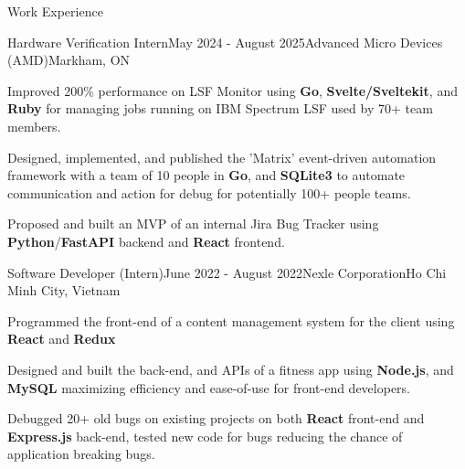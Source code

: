 \documentclass[
	11pt, %
]{resume} %
\begin{document}


\begin{rSection}{Work Experience}

	\begin{rSubsection}{Hardware Verification Intern}{May 2024 - August 2025}{Advanced Micro Devices (AMD)}{Markham, ON}
	\item Improved 200\% performance on LSF Monitor using \textbf{Go}, \textbf{Svelte/Sveltekit}, and \textbf{Ruby} for managing jobs running on IBM Spectrum LSF used by 70+ team members.
	\item Designed, implemented, and published the 'Matrix' event-driven automation framework with a team of 10 people in \textbf{Go}, and \textbf{SQLite3} to automate communication and action for debug for potentially 100+ people teams.
	\item Proposed and built an MVP of an internal Jira Bug Tracker using \textbf{Python}/\textbf{FastAPI} backend and \textbf{React} frontend.
	\end{rSubsection}

	\begin{rSubsection}{Software Developer (Intern)}{June 2022 - August 2022}{Nexle Corporation}{Ho Chi Minh City, Vietnam}
		\item Programmed the front-end of a content management system for the client using \textbf{React} and \textbf{Redux}
		\item Designed and built the back-end, and APIs of a fitness app using \textbf{Node.js}, and \textbf{MySQL} maximizing efficiency and ease-of-use for front-end developers.
		\item Debugged 20+ old bugs on existing projects on both \textbf{React} front-end and \textbf{Express.js} back-end, tested new code for bugs reducing the chance of application breaking bugs.
	\end{rSubsection}


\end{rSection}
\end{document}
